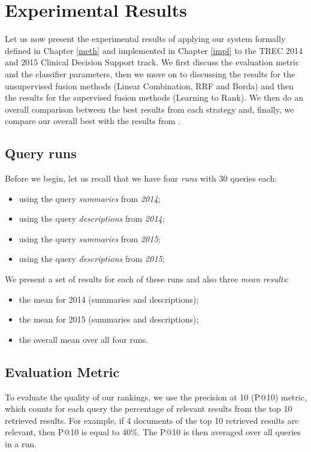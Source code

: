\chapter{Experimental Results}

Let us now present the experimental results of applying our system formally defined in Chapter \ref{meth} and implemented in Chapter 
\ref{impl}
to the TREC 2014 and 2015 Clinical Decision Support track.
We first discuss the evaluation metric and the classifier parameters,
then we move on to discussing the results for the unsupervised fusion methods (Linear Combination, RRF and Borda)
and then the results for the supervised fusion methods (Learning to Rank). We then do an overall comparison between the best results from each strategy
and, finally, we compare our overall best with the results from \cite{choi}.

\section{Query runs}\label{runs} Before we begin, let us recall that we have four \emph{runs} with 30 queries each:
\begin{itemize}
 \item using the query \emph{summaries} from \emph{2014};
 \item using the query \emph{descriptions} from \emph{2014};
 \item using the query \emph{summaries} from \emph{2015};
 \item using the query \emph{descriptions} from \emph{2015};
\end{itemize}

We present a set of results for each of these runs and also three \emph{mean results}:
\begin{itemize}
 \item the mean for 2014 (summaries and descriptions);
 \item the mean for 2015 (summaries and descriptions);
 \item the overall mean over all four runs.
\end{itemize}

\section{Evaluation Metric}
To evaluate the quality of our rankings, we use the precision at 10 (P@10) metric, which counts for each query the percentage of
relevant results from the top 10 retrieved results. For example, if 4 documents of the top 10 retrieved results are relevant,
then P@10 is equal to 40\%. The P@10 is then averaged over all queries in a run.

